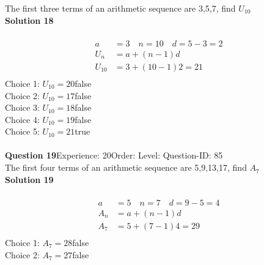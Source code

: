 \documentclass{article}
\begin{document}
The first three terms of an arithmetic sequence are 3,5,7, find $U_{10}$\\[4pt]
\noindent\textbf{Solution 18}\\[2pt]
\\[-35pt]\begin{align*}
a&=3\quad n=10 \quad d=5-3=2\\[2pt]
U_n&=a+(n-1)d\\[12pt]
U_{10}&=3+(10-1)2=21\\[2pt]
\end{align*}
Choice 1: \hspace{20pt}$U_{10}=20$\hspace{20pt}false\\
Choice 2: \hspace{20pt}$U_{10}=17$\hspace{20pt}false\\
Choice 3: \hspace{20pt}$U_{10}=18$\hspace{20pt}false\\
Choice 4: \hspace{20pt}$U_{10}=19$\hspace{20pt}false\\
Choice 5: \hspace{20pt}$U_{10}=21$\hspace{20pt}true\\
\\[4pt]
\noindent\textbf{Question 19}\hspace{20pt}Experience: 20\hspace{20pt}Order: \hspace{20pt}Level: \hspace{20pt}Question-ID: 85\\[2pt]
The first four terms of an arithmetic sequence are 5,9,13,17, find $A_7$\\[4pt]
\noindent\textbf{Solution 19}\\[2pt]
\\[-35pt]\begin{align*}
a&=5 \quad n=7 \quad d=9-5=4\\[2pt]
A_n&=a+(n-1)d\\[2pt]
A_7&=5+(7-1)4=29\\[2pt]
\end{align*}
Choice 1: \hspace{20pt}$A_7=28$\hspace{20pt}false\\
Choice 2: \hspace{20pt}$A_7=27$\hspace{20pt}false\\
\end{document}

